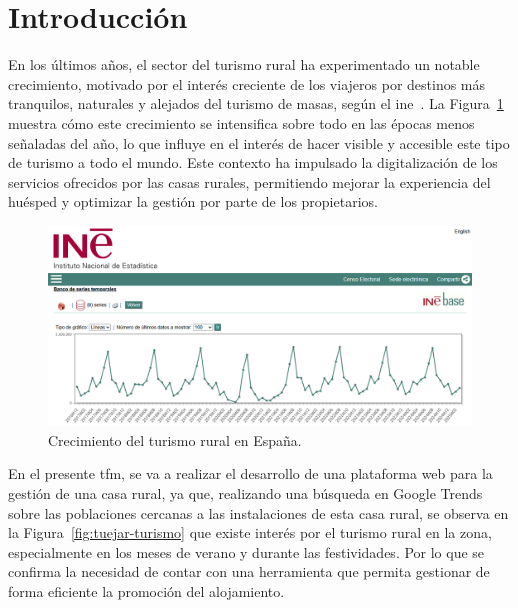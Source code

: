 
\section{Introducción}
En los últimos años, el sector del turismo rural ha experimentado un notable crecimiento, motivado por el interés creciente de los viajeros por destinos más tranquilos, naturales y alejados del turismo de masas, según el \gls{ine}~\cite{turismorural:2025}. La Figura~\ref{fig:estadistica} muestra cómo este crecimiento se intensifica sobre todo en las épocas menos señaladas del año, lo que influye en el interés de hacer visible y accesible este tipo de turismo a todo el mundo. Este contexto ha impulsado la digitalización de los servicios ofrecidos por las casas rurales, permitiendo mejorar la experiencia del huésped y optimizar la gestión por parte de los propietarios.

\begin{figure}[h!tb]
    \centering
    \includegraphics[width=1\textwidth]{figs/turismo-rural.png}
    \caption{Crecimiento del turismo rural en España.}
    \label{fig:estadistica}
\end{figure}

En el presente \gls{tfm}, se va a realizar el desarrollo de una plataforma web para la gestión de una casa rural, ya que, realizando una búsqueda en Google Trends~\cite{g-trends:2025} sobre las poblaciones cercanas a las instalaciones de esta casa rural, se observa en la Figura~\ref{fig:tuejar-turismo} que existe interés por el turismo rural en la zona, especialmente en los meses de verano y durante las festividades. Por lo que se confirma la necesidad de contar con una herramienta que permita gestionar de forma eficiente la promoción del alojamiento.

